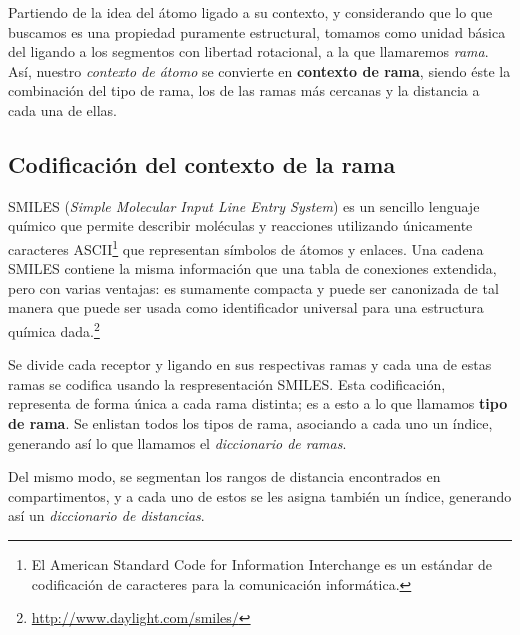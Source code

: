 Partiendo de la idea del átomo ligado a su contexto, y considerando
que lo que buscamos es una propiedad puramente estructural, tomamos
como unidad básica del ligando a los segmentos con libertad
rotacional, a la que llamaremos \textit{rama}. Así, nuestro
\textit{contexto de átomo} se convierte en \textbf{contexto de rama},
siendo éste la combinación del tipo de rama, los de las ramas más
cercanas y la distancia a cada una de ellas.

\subsection{Codificación del contexto de la rama}
SMILES (\textit{Simple Molecular Input Line Entry System}) es un
sencillo lenguaje químico que permite describir moléculas y reacciones
utilizando únicamente caracteres ASCII\footnote{El American Standard
  Code for Information Interchange es un estándar de codificación de
  caracteres para la comunicación informática.} que representan
símbolos de átomos y enlaces. Una cadena SMILES contiene la misma
información que una tabla de conexiones extendida, pero con varias
ventajas: es sumamente compacta y puede ser canonizada de tal manera
que puede ser usada como identificador universal para una estructura
química dada.\footnote{\url{http://www.daylight.com/smiles/}}

Se divide cada receptor y ligando en sus respectivas ramas y cada una
de estas ramas se codifica usando la respresentación SMILES. Esta
codificación, representa de forma única a cada rama distinta; es a
esto a lo que llamamos \textbf{tipo de rama}. Se enlistan todos los
tipos de rama, asociando a cada uno un índice, generando así lo que
llamamos el \textit{diccionario de ramas}.

Del mismo modo, se segmentan los rangos de distancia encontrados en
compartimentos, y a cada uno de estos se les asigna también un índice,
generando así un \textit{diccionario de distancias}.

